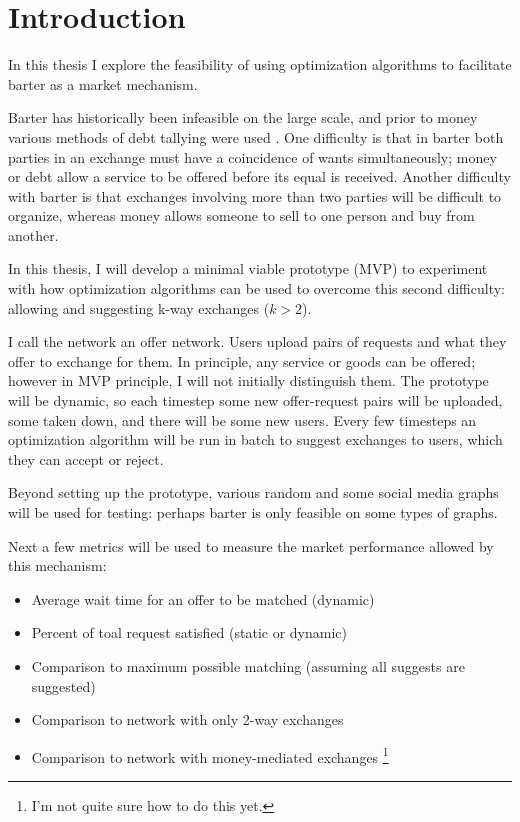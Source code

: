 \documentclass[main.tex]{subfiles}
\begin{document}
\section{Introduction}
In this thesis I explore the feasibility of using optimization algorithms to facilitate barter as a market mechanism.

Barter has historically been infeasible on the large scale, and prior to money various methods of debt tallying were used \cite{Gra1}. One difficulty is that in barter both parties in an exchange must have a coincidence of wants simultaneously; money or debt allow a service to be offered before its equal is received. Another difficulty with barter is that exchanges involving more than two parties will be difficult to organize, whereas money allows someone to sell to one person and buy from another.

In this thesis, I will develop a minimal viable prototype (MVP) to experiment with how optimization algorithms can be used to overcome this second difficulty: allowing and suggesting k-way exchanges ($k>2$).

I call the network an offer network. Users upload pairs of requests and what they offer to exchange for them. In principle, any service or goods can be offered; however in MVP principle, I will not initially distinguish them. The prototype will be dynamic, so each timestep some new offer-request pairs will be uploaded, some taken down, and there will be some new users. Every few timesteps an optimization algorithm will be run in batch to suggest exchanges to users, which they can accept or reject.

Beyond setting up the prototype, various random and some social media graphs will be used for testing: perhaps barter is only feasible on some types of graphs.

Next a few metrics will be used to measure the market performance allowed by this mechanism:
\begin{itemize}
  \item Average wait time for an offer to be matched (dynamic)
  \item Percent of toal request satisfied (static or dynamic)
  \item Comparison to maximum possible matching (assuming all suggests are suggested)
  \item Comparison to network with only 2-way exchanges
  \item Comparison to network with money-mediated exchanges \footnote{I'm not quite sure how to do this yet.}
\end{itemize}
\end{document}
